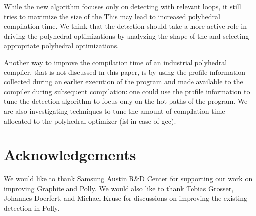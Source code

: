 \documentclass{sig-alternate}
\begin{document}
While the new algorithm focuses only on detecting  with relevant loops,
it still tries to maximize the size of the   This may lead to increased
polyhedral compilation time.  We think that the \SCoP{} detection should take a
more active role in driving the polyhedral optimizations by analyzing the shape
of the  and selecting appropriate polyhedral optimizations.

Another way to improve the compilation time of an industrial polyhedral
compiler, that is not discussed in this paper, is by using the profile
information collected during an earlier execution of the program and made
available to the compiler during subsequent compilation: one could use the
profile information to tune the \SCoP{} detection algorithm to focus only on the
hot paths of the program.  We are also investigating techniques to tune the
amount of compilation time allocated to the polyhedral optimizer (isl
\cite{verdoolaege2010isl} in case of gcc).

\section{Acknowledgements}
We would like to thank Samsung Austin R\&D Center for supporting our work on
improving Graphite and Polly.  We would also like to thank Tobias Grosser,
Johannes Doerfert, and Michael Kruse for discussions on improving the existing
\SCoP{} detection in Polly.



{\small

}
\end{document}
